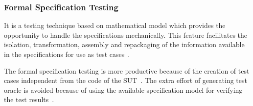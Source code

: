\subsubsection{Formal Specification Testing}
It is a testing technique based on mathematical model which provides the opportunity to handle the specifications mechanically. This feature facilitates the isolation, transformation, assembly and repackaging of the information available in the specifications for use as test cases~\cite{donat1997automating}.

The formal specification testing is more productive because of the creation of test cases independent from the code of the SUT~\cite{gaudel2010software}. The extra effort of generating test oracle is avoided because of using the available specification model for verifying the test results~\cite{bertolino2007software}.
  







